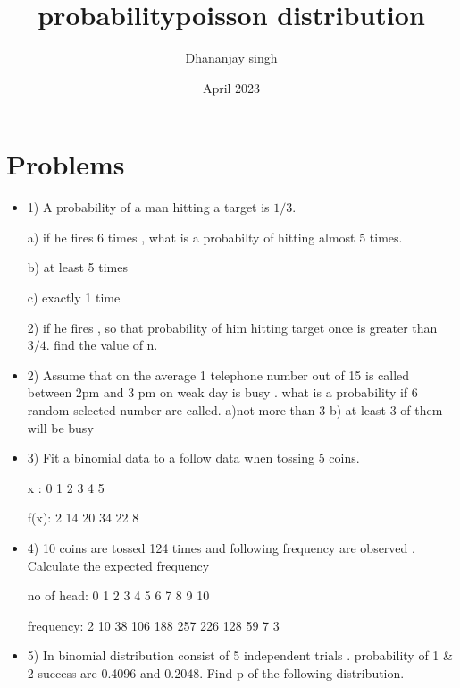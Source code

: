 \documentclass{article}
\title{probability}
\author{Dhananjay singh}
\date{April 2023}
\begin{document}
\maketitle

\section*{Problems}
\begin{itemize}
 \item 1) A probability of a man hitting a target is $1/3$.

a) if he fires  6 times , what is a probabilty of hitting almost 5 times.

b) at least 5 times

c) exactly 1 time

2) if he fires , so that probability of him hitting target once is greater than $3/4$. find the value of n.



\item 2) Assume that on the average 1 telephone number out of 15 is called between 2pm and 3 pm on weak day is busy . what is a probability if 6 random selected number are called.
a)not more than 3 
b) at least 3 of them will be busy

\item 3) Fit a binomial data to a  follow data when tossing 5 coins.

x : 0  1  2  3  4  5 


f(x): 2 14 20 34 22 8

\item 4) 10 coins are tossed 124 times and following frequency are observed . Calculate the expected frequency

no of head: 0 1 2 3 4 5 6 7 8 9 10

frequency: 2 10 38 106 188 257 226 128 59 7 3

\item 5) In binomial distribution consist of 5 independent trials . probability of 1 \& 2 success are 0.4096 and 0.2048. Find p of the following distribution.

\end{itemize}


\title{\Large poisson distribution}
\end{document}
